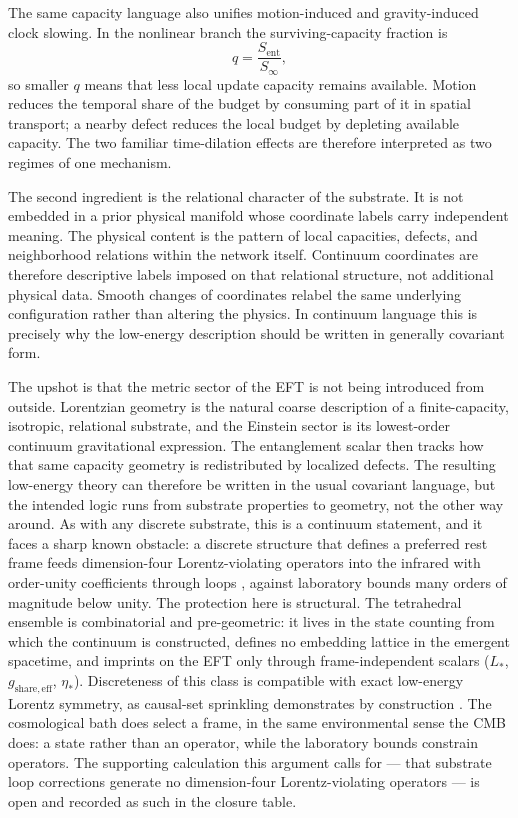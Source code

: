\documentclass[11pt]{article}
\begin{document}
The same capacity language also unifies motion-induced and gravity-induced clock slowing. In the nonlinear branch the surviving-capacity fraction is
\[
q=\frac{S_{\mathrm{ent}}}{S_\infty},
\]
so smaller $q$ means that less local update capacity remains available. Motion reduces the temporal share of the budget by consuming part of it in spatial transport; a nearby defect reduces the local budget by depleting available capacity. The two familiar time-dilation effects are therefore interpreted as two regimes of one mechanism.

The second ingredient is the relational character of the substrate. It is not embedded in a prior physical manifold whose coordinate labels carry independent meaning. The physical content is the pattern of local capacities, defects, and neighborhood relations within the network itself. Continuum coordinates are therefore descriptive labels imposed on that relational structure, not additional physical data. Smooth changes of coordinates relabel the same underlying configuration rather than altering the physics. In continuum language this is precisely why the low-energy description should be written in generally covariant form.

The upshot is that the metric sector of the EFT is not being introduced from outside. Lorentzian geometry is the natural coarse description of a finite-capacity, isotropic, relational substrate, and the Einstein sector is its lowest-order continuum gravitational expression. The entanglement scalar then tracks how that same capacity geometry is redistributed by localized defects. The resulting low-energy theory can therefore be written in the usual covariant language, but the intended logic runs from substrate properties to geometry, not the other way around. As with any discrete substrate, this is a continuum statement, and it faces a sharp known obstacle: a discrete structure that defines a preferred rest frame feeds dimension-four Lorentz-violating operators into the infrared with order-unity coefficients through loops \citep{Collins2004}, against laboratory bounds many orders of magnitude below unity. The protection here is structural. The tetrahedral ensemble is combinatorial and pre-geometric: it lives in the state counting from which the continuum is constructed, defines no embedding lattice in the emergent spacetime, and imprints on the EFT only through frame-independent scalars ($L_*$, $g_{\mathrm{share,eff}}$, $\eta_*$). Discreteness of this class is compatible with exact low-energy Lorentz symmetry, as causal-set sprinkling demonstrates by construction \citep{Bombelli1987,Dowker2004}. The cosmological bath does select a frame, in the same environmental sense the CMB does: a state rather than an operator, while the laboratory bounds constrain operators. The supporting calculation this argument calls for --- that substrate loop corrections generate no dimension-four Lorentz-violating operators --- is open and recorded as such in the closure table.
\end{document}
